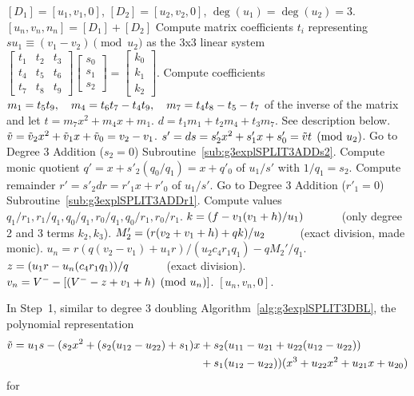\begin{algorithm}
\caption{Genus 3 Split Model Degree 3 Addition\label{alg:g3explSPLIT3ADD}}
\begin{algorithmic} [1]
\Require $[D_1]= [u_1, v_1,0]$, $[D_2]= [u_2, v_2,0]$, $\deg(u_1) = \deg(u_2) = 3$.
\Ensure $[u_n,v_n,n_n] = [D_1] + [D_2]$
\algrule
\State Compute matrix coefficients $t_i$ representing $su_1\equiv (v_1 - v_2) \pmod{u_2}$ as the 3x3 linear system $ \left[
\begin{smallmatrix} t_1 & t_2 & t_3\\ t_4 & t_5 & t_6\\ t_7 &t_8 & t_9 \end{smallmatrix}\right] \left[
\begin{smallmatrix} s_0\\ s_1 \\s_2 \end{smallmatrix} \right] = \left[ \begin{smallmatrix}k_0
\\  k_1 \\ k_2 \end{smallmatrix} \right]$.
\State Compute coefficients $m_1 = t_5t_9, \quad m_4 = t_6t_7 - t_4t_9, \quad m_7 = t_4t_8 - t_5-t_7$ of the inverse of the matrix and let $t = m_7x^2 + m_4x + m_1$.
\State $d = t_1m_1 + t_2m_4 + t_3m_7$.
\State See description below.
\EndIf
\State $\tilde{v} = \tilde{v}_2x^2 + \tilde{v}_1x + \tilde{v}_0 = v_2 - v_1$.
\State $s' = ds = s_2'x^2 + s_1'x + s_0' =  \tilde{v} t \pmod{u_2}$.
\State Go to Degree 3 Addition ($s_2=0$) Subroutine~\ref{sub:g3explSPLIT3ADDs2}.
\EndIf
\State Compute monic quotient $q'= x + s'_2(q_0/q_1) = x + q'_0$ of $u_1/s'$ with $1/q_1 = s_2$. 
\State Compute remainder $r' = s'_2dr = r'_1x + r'_0$ of $u_1/s'$.
\State Go to Degree 3 Addition ($r'_1=0$) Subroutine~\ref{sub:g3explSPLIT3ADDr1}.
\EndIf
\State Compute values $q_1/r_1, r_1/q_1, q_0/q_1, r_0/q_1, q_0/r_1, r_0/r_1$.
\State $k = (f - v_1(v_1 + h)/u_1) \quad\quad\quad $ (only degree 2 and 3 terms $k_2,k_3$).
\State $M_2' = (r(v_2 + v_1 + h) + qk)/u_2 \quad\quad\quad $(exact division, made monic).
\State $u_n = r(q(v_2 - v_1) + u_1r)/(u_2c_4r_1q_1) - qM_2'/q_1.$
\State $z = (u_1r - u_n(c_4r_1q_1))/q \quad\quad\quad$ (exact division).
\State $v_n = V^{-} - [(V^{-} - z + v_1 + h) \pmod{u_n}]$.
\State \Return $[u_n,v_n,0]$.
\end{algorithmic}
\end{algorithm} In Step~1, similar to degree 3 doubling
Algorithm~\ref{alg:g3explSPLIT3DBL}, the polynomial representation \begin{align*}
    \tilde{v} = u_1s
- (s_2x^2 + (s_2(u_{12} - u_{22}) + s_1)x &+ s_2(u_{11} - u_{21} + u_{22}(u_{12}
- u_{22})) \\
        &+ s_1(u_{12} - u_{22}))(x^3 + u_{22}x^2 + u_{21}x + u_{20})
\end{align*} for
